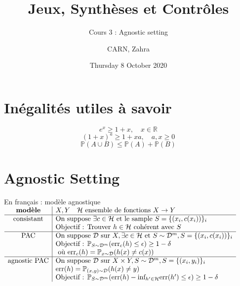 \documentclass{article}
\theoremstyle{definition}
\theoremstyle{remark}
\begin{document}
\title{Jeux, Synthèses et Contrôles}
\subtitle{\large Cours 3 : Agnostic setting}
\author{CARN, Zahra} %
\date{Thursday 8 October 2020}

\maketitle

\tableofcontents
\newpage

\section{Inégalités utiles à savoir}
\begin{equation}
    e^x\geq 1+x, \quad x\in\mathbb{R}
\end{equation}
\begin{equation}
    (1+x)^a\geq 1+xa, \quad a,x\geq 0
\end{equation}
\begin{equation}\tag{Union Bound}
    \mathbb{P}(A\cup B)\leq\mathbb{P}(A)+\mathbb{P}(B)
\end{equation}

\section{Agnostic Setting}

En français : modèle agnostique\\

$\begin{array}{c|l}
    \mbox{\textbf{modèle}} & X,Y\quad \mathcal{H} \mbox{ ensemble de fonctions } X\to Y \\
    \hline
    \mbox{consistant} & \mbox{On suppose }\exists c\in\mathcal{H} \mbox{ et le sample } S=\{(x_i,c(x_i))\}_i\\
    & \mbox{Objectif : Trouver } h\in\mathcal{H} \mbox{ cohérent avec } S\\
    \hline
    \mbox{PAC} & \mbox{On suppose } \mathcal{D}\mbox{ sur } X, \exists c\in\mathcal{H} \mbox{ et } S\sim\mathcal{D}^m, S=\{(x_i,c(x_i))\}_i\\
    & \mbox{Objectif : } \mathbb{P}_{S\sim\mathcal{D}^m}(\mbox{err}_c(h)\leq\epsilon )\geq 1-\delta \\
    & \mbox{ où } \mbox{err}_c(h)=\mathbb{P}_{x\sim\mathcal{D}}(h(x)\neq c(x))\\
    \hline
    \mbox{agnostic PAC} & \mbox{On suppose } \mathcal{D}\mbox{ sur } X\times Y, S\sim\mathcal{D}^m, S=\{(x_i,y_i)\}_i\\
    & \mbox{err}(h)= \mathbb{P}_{(x,y)\sim\mathcal{D}} (h(x)\neq y)\\
    & \mbox{Objectif : } \mathbb{P}_{S\sim\mathcal{D}^m}(\mbox{err}(h)-\mbox{inf}_{h'\in\mathcal{H}}\mbox{err}(h')\leq\epsilon)\geq 1-\delta\\
\end{array}$
\end{document}
